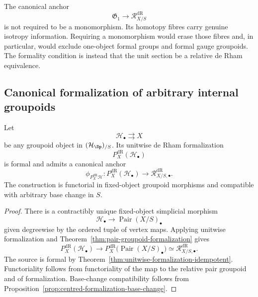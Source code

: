 \begin{remark}
\label{rem:no-mono-formal-gpd}
The canonical anchor
\[
    \mathfrak G_1\longrightarrow \mathcal R^{\mathrm{dR}}_{X/S}
\]
is not required to be a monomorphism.  Its homotopy fibres carry genuine
isotropy information.  Requiring a monomorphism would erase those fibres and,
in particular, would exclude one-object formal groups and formal gauge
groupoids.  The formality condition is instead that the unit section be a relative de Rham
equivalence.
\end{remark}

\subsection{Canonical formalization of arbitrary internal groupoids}

\begin{theorem}
\label{thm:canonical-unitwise-formalization}
Let
\[
    \mathcal H_\bullet\rightrightarrows X
\]
be any groupoid object in $(\mathcal H_{\Sp})_{/S}$.  Its unitwise de Rham formalization
\[
    P_X^{\mathrm{dR}}(\mathcal H_\bullet)
\]
is formal and admits a canonical anchor
\[
    \phi_{P_X^{\mathrm{dR}}\mathcal H}:
    P_X^{\mathrm{dR}}(\mathcal H_\bullet)
    \longrightarrow
    \mathcal R^{\mathrm{dR}}_{X/S,\bullet}.
\]
The construction is functorial in fixed-object groupoid morphisms and
compatible with arbitrary base change in $S$.
\end{theorem}

\begin{proof}
There is a contractibly unique fixed-object simplicial morphism
\[
    \mathcal H_\bullet
    \longrightarrow
    \operatorname{Pair}(X/S)_\bullet
\]
given degreewise by the ordered tuple of vertex maps.  Applying unitwise
formalization and Theorem~\ref{thm:pair-groupoid-formalization} gives
\[
    P_X^{\mathrm{dR}}(\mathcal H_\bullet)
    \longrightarrow
    P_X^{\mathrm{dR}}\bigl(\operatorname{Pair}(X/S)_\bullet\bigr)
    \simeq
    \mathcal R^{\mathrm{dR}}_{X/S,\bullet}.
\]
The source is formal by
Theorem~\ref{thm:unitwise-formalization-idempotent}.  Functoriality follows from
functoriality of the map to the relative pair groupoid and of formalization.
Base-change compatibility follows from
Proposition~\ref{prop:centred-formalization-base-change}.
\end{proof}

